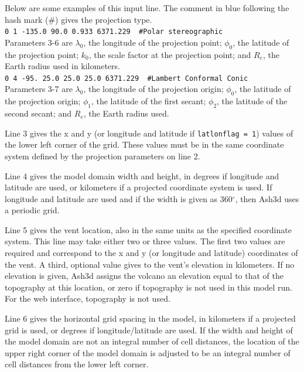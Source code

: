 \normalsize
Below are some examples of
this input line. The comment in blue following the hash mark (\#) gives
the projection type.\\
\texttt{0 1 -135.0 90.0 0.933 6371.229 {\color{blue} \#Polar stereographic}}\\
Parameters 3-6 are
$\lambda_0$, the longitude of the projection point;
$\phi_0$, the latitude of the projection point;
$k_0$, the scale factor at the projection point;
and $R_e$, the Earth radius used in kilometers.\\
\texttt{0 4 -95. 25.0 25.0 25.0 6371.229 {\color{blue} \#Lambert Conformal Conic}}\\
Parameters 3-7 are
$\lambda_0$, the longitude of the projection origin;
$\phi_0$, the latitude of the projection origin;
$\phi_1$, the latitude of the first secant;
$\phi_2$, the latitude of the second secant;
and $R_e$, the Earth radius used.

Line 3 gives the x and y (or longitude and latitude if \texttt{latlonflag = 1})
values of the lower
left corner of the grid. These values must be in the same coordinate system
defined by the projection parameters on line 2.

Line 4 gives the model domain width and height, in degrees if longitude and latitude
are used, or kilometers if a projected coordinate system is used.
If longitude and latitude are used and if the width is given as 360$^{\circ}$,
then Ash3d uses a periodic grid.

Line 5 gives the vent location, also in the same units as the specified
coordinate system. This line may take either two or three values. The first
two values are required and correspond to the x and y (or longitude and
latitude) coordinates of the vent. A third, optional value gives to the
vent’s elevation in
kilometers. If no elevation is given, Ash3d assigns the volcano an elevation
equal to that of the topography at this location, or zero if topography is
not used in this model run. For the web interface, topography is not used.

Line 6 gives the horizontal grid spacing in the model, in kilometers if a
projected grid is used, or degrees if longitude/latitude are used. If the
width and height of the model domain are not an integral number of cell
distances, the location of the upper right corner of the model domain is
adjusted to be an integral number of cell distances from the lower left
corner.

